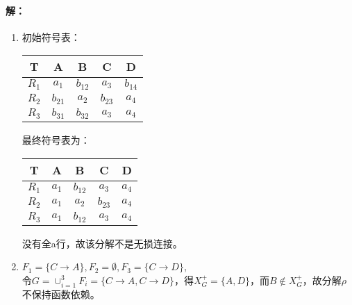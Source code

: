 \paragraph{解：}
\begin{enumerate}
	\item 初始符号表：
	\begin{table}[H]
		\centering
		\begin{tabular}{|c|c|c|c|c|}
			\hline
			T & A & B & C & D \\\hline
			$R_{1}$ & $a_{1}$ & $b_{12}$ & $a_{3}$ & $b_{14}$ \\
			$R_{2}$ & $b_{21}$ & $a_{2}$ & $b_{23}$ & $a_{4}$ \\
			$R_{3}$ & $b_{31}$ & $b_{32}$ & $a_{3}$ & $a_{4}$ \\\hline
		\end{tabular}
	\end{table}
	最终符号表为：
	\begin{table}[H]
		\centering
		\begin{tabular}{|c|c|c|c|c|}
			\hline
			T & A & B & C & D \\\hline
			$R_{1}$ & $a_{1}$ & $b_{12}$ & $a_{3}$ & $a_{4}$ \\
			$R_{2}$ & $a_{1}$ & $a_{2}$ & $b_{23}$ & $a_{4}$ \\
			$R_{3}$ & $a_{1}$ & $b_{12}$ & $a_{3}$ & $a_{4}$ \\\hline
		\end{tabular}
	\end{table}
	没有全a行，故该分解不是无损连接。
	
	\item $F_{1}=\{C \to A\}, F_{2}=\emptyset, F_{3}=\{C \to D\}$, \\ 令$G=\cup_{i=1}^{3}F_{i}=\{C \to A, C \to D\}$，得$X_{G}^{+}=\{A, D\}$，而$B \notin X_{G}^{+}$，故分解$\rho$不保持函数依赖。
\end{enumerate}